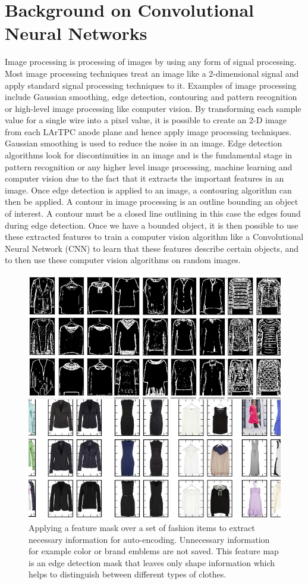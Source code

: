 \chapter{Background on Convolutional Neural Networks}\label{ch:cnn}
Image processing is processing of images by using any form of signal processing. Most image processing techniques treat an image like a 2-dimensional signal and apply standard signal processing techniques to it. Examples of image processing include Gaussian smoothing, edge detection, contouring and pattern recognition or high-level image processing like computer vision. By transforming each sample value for a single wire into a pixel value, it is possible to create an 2-D image from each LArTPC anode plane and hence apply image processing techniques. Gaussian smoothing is used to reduce the noise in an image. Edge detection algorithms look for discontinuities in an image and is the fundamental stage in pattern recognition or any higher level image processing, machine learning and computer vision due to the fact that it extracts the important features in an image. Once edge detection is applied to an image, a contouring algorithm can then be applied. A contour in image processing is an outline bounding an object of interest. A contour must be a closed line outlining in this case the edges found during edge detection. Once we have a bounded object, it is then possible to use these extracted features to train a computer vision algorithm like a Convolutional Neural Network (CNN) to learn that these features describe certain objects, and to then use these computer vision algorithms on random images.


\begin{figure}[t!]
\centering
\includegraphics[width=.48\linewidth]{figs/convolution.png}
\caption{Applying a feature mask over a set of fashion items to extract necessary information for auto-encoding. Unnecessary information for example color or brand emblems are not saved. This feature map is an edge detection mask that leaves only shape information which helps to distinguish between different types of clothes.} 
\label{fig:convolution}
\end{figure}


